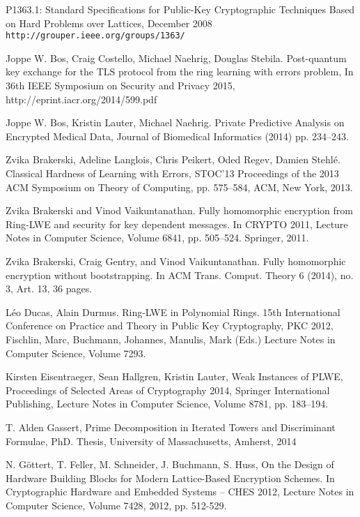 \documentclass{llncs}
\newcommand{\<}{\langle}
\renewcommand{\>}{\rangle}
\begin{document}
\begin{thebibliography}{BBCE10}

 P1363.1: Standard Specifications for Public-Key Cryptographic Techniques Based on Hard Problems over Lattices,  December 2008 
{\tt http://grouper.ieee.org/groups/1363/}



 Joppe W. Bos, Craig Costello, Michael Naehrig, Douglas Stebila.
Post-quantum key exchange for the TLS protocol from the ring learning with errors problem, In 36th IEEE Symposium on Security and Privacy 2015, http://eprint.iacr.org/2014/599.pdf

 Joppe W. Bos, Kristin Lauter, Michael Naehrig. Private Predictive Analysis on Encrypted Medical Data,
Journal of Biomedical Informatics (2014) pp. 234--243. 


  Zvika Brakerski, Adeline Langlois, Chris Peikert, Oded Regev, Damien Stehl\'e. Classical Hardness of Learning with Errors,  STOC'13 Proceedings of the 2013 ACM Symposium on Theory of Computing, pp. 575--584, ACM, New York, 2013.

 Zvika Brakerski and Vinod Vaikuntanathan. Fully homomorphic encryption from Ring-LWE and security for key dependent messages. In CRYPTO 2011, Lecture Notes in Computer Science, Volume 6841, pp. 505--524. Springer, 2011.

 Zvika Brakerski, Craig Gentry, and Vinod Vaikuntanathan. Fully homomorphic encryption without bootstrapping. In ACM Trans. Comput. Theory 6 (2014), no. 3, Art. 13, 36 pages.


 L\'eo Ducas, Alain Durmus. Ring-LWE in Polynomial Rings.
15th International Conference on Practice and Theory in Public Key Cryptography, PKC 2012,
Fischlin, Marc, Buchmann, Johannes, Manulis, Mark (Eds.)
Lecture Notes in Computer Science, Volume 7293.


 Kirsten Eisentraeger, Sean Hallgren, Kristin Lauter, Weak Instances of PLWE, Proceedings of Selected Areas of Cryptography 2014, Springer International Publishing, Lecture Notes in Computer Science, Volume 8781, pp. 183--194.

 T. Alden Gassert, Prime Decomposition in Iterated Towers and Discriminant Formulae, PhD. Thesis, University of Massachusetts, Amherst, 2014

 N. G\"{o}ttert, T. Feller, M. Schneider, J. Buchmann, S. Huss, On the Design of Hardware Building Blocks for Modern Lattice-Based Encryption Schemes. In Cryptographic Hardware and Embedded Systems – CHES 2012, Lecture Notes in Computer Science, Volume 7428, 2012, pp. 512-529.


\end{thebibliography}
\end{document}
